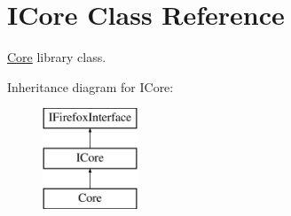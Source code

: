 \hypertarget{classefb_1_1ICore}{
\section{ICore Class Reference}
\label{classefb_1_1ICore}
}


\hyperlink{classefb_1_1Core}{Core} library class.  


Inheritance diagram for ICore:\begin{figure}[H]
\begin{center}
\leavevmode
\includegraphics[height=3.000000cm]{classefb_1_1ICore}
\end{center}
\end{figure}
